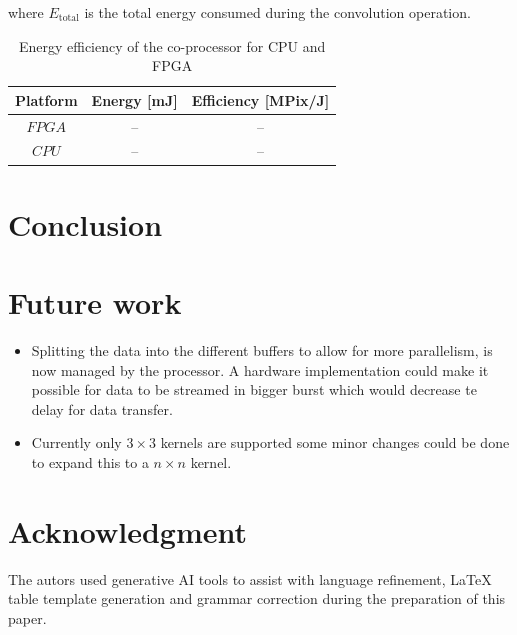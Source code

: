 \documentclass[conference]{IEEEtran}
\begin{document}
where $E_\text{total}$ is the total energy consumed during the convolution operation.

\begin{table}[H]
\centering
\caption{Energy efficiency of the co-processor for CPU and FPGA}
\begin{tabular}{c c c}
\hline
Platform & Energy [mJ] & Efficiency [MPix/J] \\
\hline
$FPGA$ & -- & -- \\
$CPU$ & -- & -- \\
\hline
\end{tabular}
\label{tab:energy-efficiency}
\end{table}



\section{Conclusion}




\section{Future work}

\begin{itemize}[noitemsep]
  \item Splitting the data into the different buffers to allow for more parallelism, is now managed by the processor. A hardware implementation could make it possible for data to be streamed in bigger burst which would decrease te delay for data transfer.
  \item Currently only $3\times3$ kernels are supported some minor changes could be done to expand this to a $n\times n $ kernel. 
\end{itemize}


\section*{Acknowledgment}
The autors used generative AI tools to assist with language refinement, LaTeX table template generation and grammar correction during the preparation of this paper.
\end{document}
